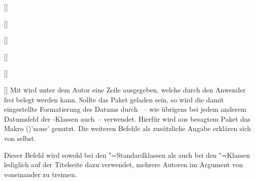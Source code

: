 \begin{Declaration*}{}
\begin{Declaration*}{}
\begin{Declaration*}{}
\begin{Declaration}{[]}
\begin{Declaration}{[]}
\begin{Declaration}{[]}
\begin{Declaration}{[]}
\begin{Declaration}{[]}
\begin{Declaration}{[]}
Mit  wird unter dem Autor eine Zeile ausgegeben, welche 
durch den Anwender frei belegt werden kann. Sollte das Paket  
geladen sein, so wird die damit eingestellte Formatierung des Datums durch 
~-- wie übrigens bei jedem anderem Datumsfeld der 
\TUDScript-Klassen auch~-- verwendet. Hierfür wird aus besagtem Paket das Makro 
()'none' genutzt. Die weiteren Befehle als 
zusätzliche Angabe erklären sich von selbst.
\end{Declaration}
\end{Declaration}
\end{Declaration}
\end{Declaration}
\end{Declaration}
\end{Declaration}

\begin{Declaration}{}
\printdeclarationlist%
%
%
Dieser Befehl wird sowohl bei den "=Standardklassen als auch bei 
den \KOMAScript"=Klassen lediglich auf der Titelseite dazu verwendet, mehrere 
Autoren im Argument von  voneinander zu trennen.


\end{Declaration}
\end{Declaration*}
\end{Declaration*}
\end{Declaration*}
